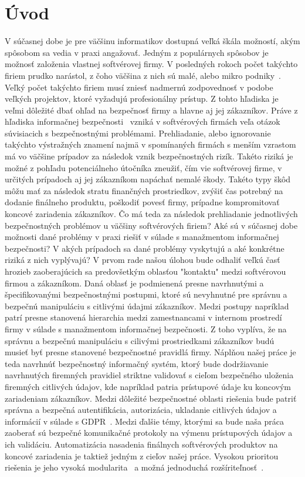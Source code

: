 \chapter{Úvod}\label{ch:úvod}

\par V súčasnej dobe je pre väčšinu informatikov dostupná veľká škála možností, akým spôsobom sa vedia v praxi angažovať.
Jedným z populárnych spôsobov je možnosť založenia vlastnej softvérovej firmy. V posledných rokoch počet takýchto firiem
prudko narástol, z čoho väčšina z nich sú malé, alebo mikro podniky~\cite{SoftwareBusiness}. Veľký počet takýchto firiem musí zniesť
nadmernú zodpovednosť v podobe veľkých projektov, ktoré vyžadujú profesionálny prístup. Z tohto hľadiska je veľmi dôležité
dbať ohľad na bezpečnosť firmy a hlavne aj jej zákazníkov. Práve z hľadiska informačnej bezpečnosti~\cite{IB} vzniká v softvérových
firmách veľa otázok súvisiacich s bezpečnostnými problémami. Prehliadanie, alebo ignorovanie takýchto výstražných znamení
najmä v spomínaných firmách s menším vzrastom má vo väčšine prípadov za následok vznik bezpečnostných rizík. Takéto riziká
je možné z pohľadu potenciálneho útočníka zneužiť, čím vie softvérovej firme, v určitých prípadoch aj jej zákazníkom napáchať
nemalé škody. Takéto typy škôd môžu mať za následok stratu finančných prostriedkov, zvýšiť čas potrebný na dodanie finálneho
produktu, poškodiť povesť firmy, prípadne kompromitovať koncové zariadenia zákazníkov. Čo má teda za následok prehliadanie
jednotlivých bezpečnostných problémov u väčšiny softvérových firiem? Aké sú v súčasnej dobe možnosti dané problémy v praxi
riešiť v súlade s manažmentom informačnej bezpečnosti? V akých prípadoch sa dané problémy vyskytujú a aké konkrétne riziká
z nich vyplývajú? V prvom rade našou úlohou bude odhaliť veľkú časť hrozieb zaoberajúcich sa predovšetkým oblasťou
"kontaktu" medzi softvérovou firmou a zákazníkom. Daná oblasť je podmienená presne navrhnutými a špecifikovanými bezpečnostnými
postupmi, ktoré sú nevyhnutné pre správnu a bezpečnú manipuláciu s citlivými údajmi zákazníkov. Medzi postupy napríklad patrí
presne stanovená hierarchia medzi zamestnancami v internom prostredí firmy v súlade s manažmentom informačnej bezpečnosti.
Z toho vyplíva, že na správnu a bezpečnú manipuláciu s cilivými prostriedkami zákazníkov budú musieť byť presne stanovené
bezpečnostné pravidlá firmy. Náplňou našej práce je teda navrhnúť bezpečnostný informačný systém, ktorý bude dodržiavanie
navrhnutých firemných pravidiel striktne validovať s cieľom bezpečného uloženia firemných citlivých údajov, kde napríklad
patria prístupové údaje ku koncovým zariadeniam zákazníkov. Medzi dôležité bezpečnostné oblasti riešenia bude patriť správna
a bezpečná autentifikácia, autorizácia, ukladanie citlivých údajov a informácií v súlade s GDPR~\cite{GDPR}. Medzi ďalšie témy, ktorými
sa bude naša práca zaoberať sú bezpečné komunikačné protokoly na výmenu prístupových údajov a ich validáciu. Automatizácia
nasadenia finálnych softvérových produktov na koncové zariadenia je taktiež jedným z cieľov našej práce. Vysokou prioritou
riešenia je jeho vysoká modularita~\cite{Modularity} a možná jednoduchá rozšíriteľnosť~\cite{Scalability}.
